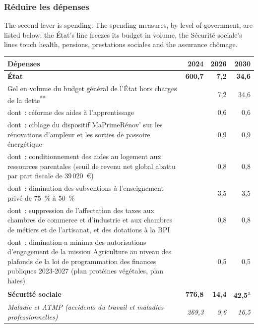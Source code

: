 \subsubsection{Réduire les dépenses}

The second lever is spending. The spending measures, by level of government,
are listed below; the État's line freezes its budget in
volume, the Sécurité sociale's lines touch health, pensions, prestations
sociales and the assurance chômage.

\begin{center}
\begin{minipage}{\textwidth}
  \centering
  \footnotesize
  \begin{tabularx}{\textwidth}{@{}>{\raggedright\arraybackslash}Xrrr@{}}
    \toprule
    Dépenses & 2024 & 2026 & 2030 \\
    \midrule
    \textbf{État} & \textbf{600,7} & \textbf{7,2} & \textbf{34,6} \\
    Gel en volume du budget général de l'État hors charges de la dette\textsuperscript{**} & & 7,2 & 34,6 \\
    \setlength{\leftskip}{1em} dont~: réforme des aides à l'apprentissage & & 0,6 & 0,6 \\
    \setlength{\leftskip}{1em} dont~: ciblage du dispositif MaPrimeRénov' sur les rénovations d'ampleur et les sorties de passoire énergétique & & 0,9 & 0,9 \\
    \setlength{\leftskip}{1em} dont~: conditionnement des aides au logement aux ressources parentales (seuil de revenu net global abattu par part fiscale de 39\,020~€) & & 0,8 & 0,8 \\
    \setlength{\leftskip}{1em} dont~: diminution des subventions à l'enseignement privé de 75~\% à 50~\% & & 3,5 & 3,5 \\
    \setlength{\leftskip}{1em} dont~: suppression de l'affectation des taxes aux chambres de commerce et d'industrie et aux chambres de métiers et de l'artisanat, et des dotations à la BPI & & 0,8 & 0,8 \\
    \setlength{\leftskip}{1em} dont~: diminution a minima des autorisations d'engagement de la mission Agriculture au niveau des plafonds de la loi de programmation des finances publiques 2023-2027 (plan protéines végétales, plan haies) & & 0,5 & 0,5 \\
    \midrule
    \textbf{Sécurité sociale} & \textbf{776,8} & \textbf{14,4} & \textbf{42,5}\textsuperscript{a} \\
    \textit{Maladie et ATMP (accidents du travail et maladies professionnelles)} & \textit{269,3} & \textit{9,6} & \textit{16,5} \\

\end{tabularx}
\end{minipage}
\end{center}
